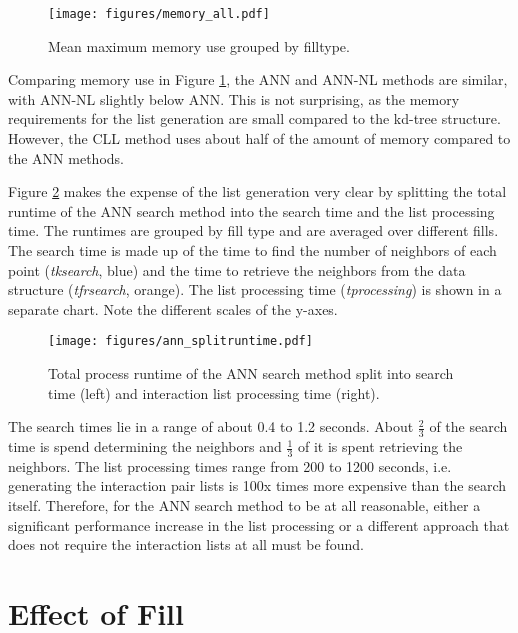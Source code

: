 \begin{figure}[h]
	\centering
	\texttt{[image: figures/memory\_all.pdf]}
	\caption{Mean maximum memory use grouped by filltype.}
	\label{FIG:memoryall}
\end{figure}

\pagebreak{}

Comparing memory use in Figure \ref{FIG:memoryall}, the ANN and ANN-NL methods are similar, with ANN-NL slightly below ANN. This is not surprising, as the memory requirements for the list generation are small compared to the kd-tree structure. However, the CLL method uses about half of the amount of memory compared to the ANN methods.

Figure \ref{FIG:splitruntimeann} makes the expense of the list generation very clear by splitting the total runtime of the ANN search method into the search time and the list processing time. The runtimes are grouped by fill type and are averaged over different fills. The search time is made up of the time to find the number of neighbors of each point ({\itshape tksearch}, blue) and the time to retrieve the neighbors from the data structure ({\itshape tfrsearch}, orange). The list processing time ({\itshape tprocessing}) is shown in a separate chart.  Note the different scales of the y-axes. 

\begin{figure}[h]
	\centering
	\texttt{[image: figures/ann\_splitruntime.pdf]}
	\caption{Total process runtime of the ANN search method split into search time (left) and interaction list processing time (right).}
	\label{FIG:splitruntimeann}
\end{figure}

The search times lie in a range of about 0.4 to 1.2 seconds. About $\frac{2}{3}$ of the search time is spend determining the neighbors and $\frac{1}{3}$ of it is spent retrieving the neighbors. The list processing times range from 200 to 1200 seconds, i.e. generating the interaction pair lists is 100x times more expensive than the search itself. Therefore, for the ANN search method to be at all reasonable, either a significant performance increase in the list processing or a different approach that does not require the interaction lists at all must be found. 

\section{Effect of Fill}
\label{SECTION:ANALYSISFILL}

